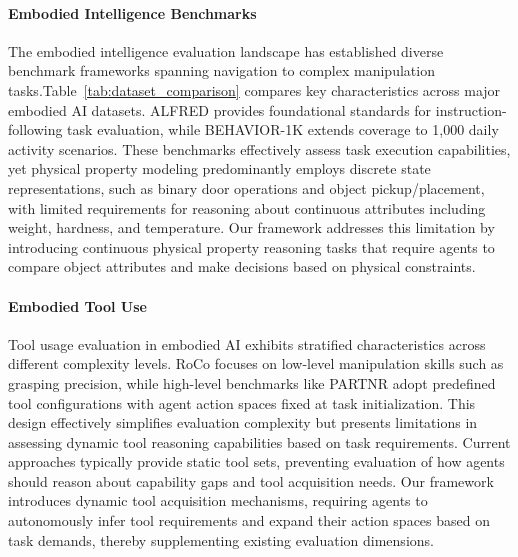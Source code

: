 \paragraph{Embodied Intelligence Benchmarks}
The embodied intelligence evaluation landscape has established diverse benchmark frameworks spanning navigation to complex manipulation tasks\citep{puig2023habitat,li2021igibson}.Table~\ref{tab:dataset_comparison} compares key characteristics across major embodied AI datasets.  ALFRED \citep{shridhar2020alfredbenchmarkinterpretinggrounded} provides foundational standards for instruction-following task evaluation, while BEHAVIOR-1K \citep{li2024behavior} extends coverage to 1,000 daily activity scenarios. These benchmarks effectively assess task execution capabilities, yet physical property modeling predominantly employs discrete state representations, such as binary door operations and object pickup/placement, with limited requirements for reasoning about continuous attributes including weight, hardness, and temperature. Our framework addresses this limitation by introducing continuous physical property reasoning tasks that require agents to compare object attributes and make decisions based on physical constraints.

\paragraph{Embodied Tool Use}
Tool usage evaluation in embodied AI exhibits stratified characteristics across different complexity levels. RoCo \citep{mandi2024roco} focuses on low-level manipulation skills such as grasping precision, while high-level benchmarks like PARTNR \citep{chang2024partnrbenchmarkplanningreasoning} adopt predefined tool configurations with agent action spaces fixed at task initialization. This design effectively simplifies evaluation complexity but presents limitations in assessing dynamic tool reasoning capabilities based on task requirements. Current approaches typically provide static tool sets, preventing evaluation of how agents should reason about capability gaps and tool acquisition needs. Our framework introduces dynamic tool acquisition mechanisms, requiring agents to autonomously infer tool requirements and expand their action spaces based on task demands, thereby supplementing existing evaluation dimensions.

